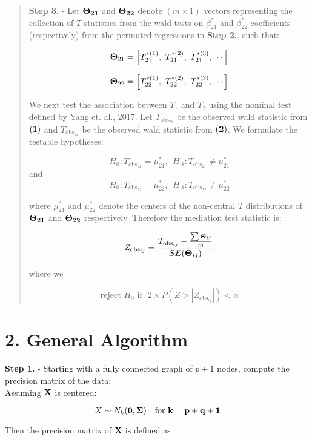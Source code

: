 \documentclass[12pt]{report}
\begin{document}
\begin{quote}
\textbf{Step 3.} - Let $\bf \Theta_{21}$ and $\bf \Theta_{22}$ denote $(m \times 1)$ vectors representing the collection of $T$ statistics from the wald tests on $\beta_{21}^{\ast}$ and $\beta_{22}^{\ast}$ coefficients (respectively) from the permuted regressions in \textbf{Step 2.}. such that:

\[ {\bf \Theta}_{21} = \left[ T_{21}^{\ast (1)}, \ T_{21}^{\ast (2)}, \ T_{21}^{\ast (3)}, \cdots \right] \]

\[ {\bf \Theta}_{22} = \left[ T_{22}^{\ast (1)}, \ T_{22}^{\ast (2)}, \ T_{22}^{\ast (3)}, \cdots \right]  \]

We next test the association between $T_1$ and $T_2$ using the nominal test defined by Yang et. al., 2017. Let $T_{\text{obs}_{21}}$ be the observed wald statistic from $\bf (1)$ and $T_{\text{obs}_{22}}$ be the observed wald statistic from $\bf(2)$. We formulate the testable hypotheses: 

\[ H_0: T_{\text{obs}_{21}} = \mu_{21}^{\ast}, \ \ H_A: T_{\text{obs}_{21}} \neq \mu_{21}^{\ast} \]
and
\[ H_0: T_{\text{obs}_{22}} = \mu_{22}^{\ast}, \ \ H_A: T_{\text{obs}_{22}} \neq \mu_{22}^{\ast} \]

where $\mu_{21}^{\ast}$ and $\mu_{22}^{\ast}$ denote the centers of the non-central $T$ distributions of $\bf \Theta_{21}$ and $\bf \Theta_{22}$ respectively. Therefore the mediation test statistic is:

\[ Z_{\text{obs}_{ij}} = \frac{T_{\text{obs}_{ij}} - \frac{\sum {\bf \Theta}_{ij}}{m} }{SE({\bf \Theta}_{ij})} \]

where we 

\[ \text{reject $H_0$ if} \ \ \ 2\times P(Z >  |Z_{\text{obs}_{ij}}|) < \alpha \]

\end{quote}



\section*{2. General Algorithm}

\textbf{Step 1.} - Starting with a fully connected graph of $p+1$ nodes, compute the precision matrix of the data: \\
Assuming $\bf X$ is centered:

\[ X \sim N_k({\bf 0}, \bf{\Sigma})  \ \ \ \text{for} \ k=p+q+1\]
 
Then the precision matrix of $\bf X$ is defined as 
\end{document}
